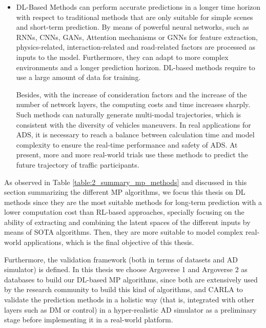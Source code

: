\begin{itemize}
	\item \ac{DL}-Based Methods can perform accurate predictions in a longer time horizon with respect to traditional methods that are only suitable for simple scenes and short-term prediction. By means of powerful neural networks, such as \acp{RNN}, \acp{CNN}, \acp{GAN}, Attention mechanisms or \acp{GNN} for feature extraction, physics-related, interaction-related and road-related factors are processed as inputs to the model. Furthermore, they can adapt to more complex environments and a longer prediction horizon. \ac{DL}-based methods require to use a large amount of data for training.
	
	Besides, with the increase of consideration factors and the increase of the number of network layers, the computing costs and time increases sharply. Such methods can naturally generate multi-modal trajectories, which is consistent with the diversity of vehicles maneuvers. In real applications for \ac{ADS}, it is necessary to reach a balance between calculation time and model complexity to ensure the real-time performance and safety of \ac{ADS}. At present, more and more real-world trials use these methods to predict the future trajectory of traffic participants.
\end{itemize}	
	
As observed in Table \ref{table:2_summary_mp_methods} and discussed in this section summarizing the different \ac{MP} algorithms, we focus this thesis on \ac{DL} methods since they are the most suitable methods for long-term prediction with a lower computation cost than \ac{RL}-based approaches, specially focusing on the ability of extracting and combining the latent spaces of the different inputs by means of \ac{SOTA} algorithms. Then, they are more suitable to model complex real-world applications, which is the final objective of this thesis.

Furthermore, the validation framework (both in terms of datasets and \ac{AD} simulator) is defined. In this thesis we choose Argoverse 1 and Argoverse 2 as databases to build our \ac{DL}-based \ac{MP} algorithms, since both are extensively used by the research community to build this kind of algorithms, and \ac{CARLA} to validate the prediction methods in a holistic way (that is, integrated with other layers such as \ac{DM} or control) in a hyper-realistic \ac{AD} simulator as a preliminary stage before implementing it in a real-world platform.